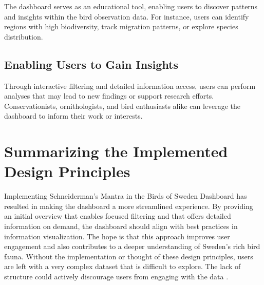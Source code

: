 The dashboard serves as an educational tool, enabling users to discover patterns and insights within the bird observation data. For instance, users can identify regions with high biodiversity, track migration patterns, or explore species distribution.

\subsection{Enabling Users to Gain Insights}

Through interactive filtering and detailed information access, users can perform analyses that may lead to new findings or support research efforts. Conservationists, ornithologists, and bird enthusiasts alike can leverage the dashboard to inform their work or interests.

\section{Summarizing the Implemented Design Principles}

Implementing Schneiderman's Mantra \cite{fitzgeraldSchneidermansMantra2016} in the Birds of Sweden Dashboard has resulted in making the dashboard a more streamlined experience. By providing an initial overview that enables focused filtering and that offers detailed information on demand, the dashboard should align with best practices in information visualization. The hope is that this approach improves user engagement and also contributes to a deeper understanding of Sweden's rich bird fauna. Without the implementation or thought of these design principles, users are left with a very complex dataset that is difficult to explore. The lack of structure could actively discourage users from engaging with the data \cite{craftGuidelinesWhatCan2005}.